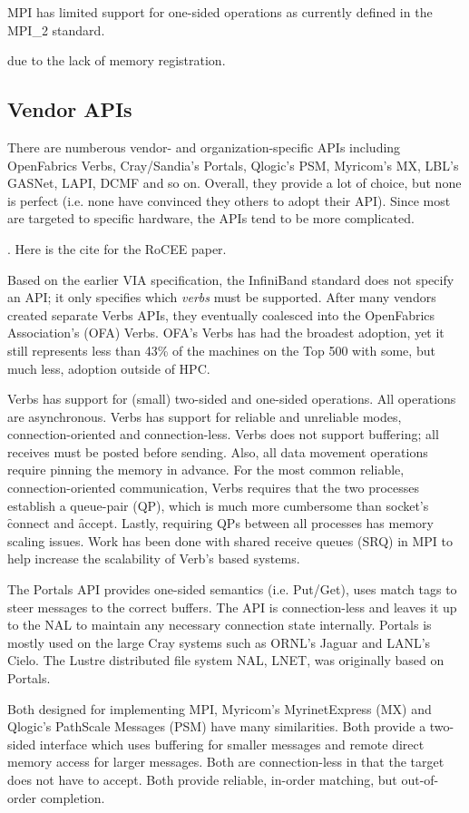 MPI has limited support for one-sided operations as currently defined
in the MPI\_2 standard\cite{geist96:_mpi2_lyon}. 

due to the lack of
memory registration.

\subsection{Vendor APIs} There are numberous vendor- and
organization-specific APIs including OpenFabrics
Verbs\cite{ofa-verbs}, Cray/Sandia's Portals\cite{portals}, Qlogic's
PSM\cite{psm}, Myricom's MX\cite{mx}, LBL's GASNet\cite{gasnet},
LAPI\cite{lapi_a_1998}, DCMF\cite{Kumar:2008:DCM:1375527.1375544} and
so on.  Overall, they provide a lot of choice, but none is perfect
(i.e. none have convinced they others to adopt their API).  Since most
are targeted to specific hardware, the APIs tend to be more
complicated.

.
Here is the cite for the RoCEE paper\cite{RoCEE}.

Based on the earlier VIA specification\cite{via}, the InfiniBand standard does not specify
an API; it only specifies which \emph{verbs} must be supported. After many vendors created
separate Verbs APIs, they eventually coalesced into the OpenFabrics Association's (OFA)
Verbs. OFA's Verbs has had the broadest adoption, yet it still represents less than 43\%
of the machines on the Top 500\cite{top500} with some, but much less, adoption outside of
HPC.

Verbs has support for (small) two-sided and one-sided operations. All operations are
asynchronous. Verbs has support for reliable and unreliable modes, connection-oriented
and connection-less. Verbs does not support buffering; all receives must be posted before
sending. Also, all data movement operations require pinning the memory in advance. For the
most common reliable, connection-oriented communication, Verbs requires that the two
processes establish a queue-pair (QP), which is much more cumbersome than socket's
\f{connect} and \f{accept}. Lastly, requiring QPs between all processes has memory scaling
issues. Work has been done with shared receive queues (SRQ) in MPI\cite{srq} to help
increase the scalability of Verb's based systems.

The Portals API provides one-sided semantics (i.e.  Put/Get), uses match tags to steer
messages to the correct buffers. The API is connection-less and leaves it up to the NAL to
maintain any necessary connection state internally. Portals is mostly used on the large
Cray systems such as ORNL's Jaguar\cite{jaguar_cug_2010} and LANL's Cielo\cite{cielo}.  The
Lustre distributed file system NAL, LNET, was originally based on Portals\cite{lnet}.

Both designed for implementing MPI, Myricom's MyrinetExpress (MX) and Qlogic's PathScale
Messages (PSM) have many similarities. Both provide a two-sided interface which uses
buffering for smaller messages and remote direct memory access for larger messages.  Both
are connection-less in that the target does not have to accept.  Both provide reliable,
in-order matching, but out-of-order completion.

